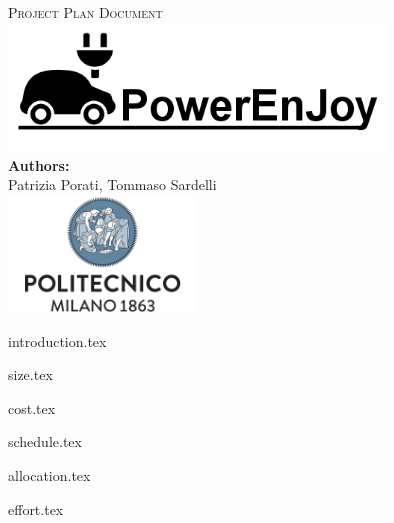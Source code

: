 \documentclass[a4paper,11pt]{article}
\begin{document}
\begin{titlepage}
\begin{center}
\textsc{\LARGE Project Plan Document}\\[1.5cm] %

\includegraphics[width=10cm]{PowerEnJoy.png}\\
\vfill
\vfill
\textbf{Authors:}\\
Patrizia Porati, Tommaso Sardelli\\[2.0cm] 


\vfill
\vfill
\includegraphics[width=50mm]{polimi.png}\\
\end{center}
\end{titlepage}

\tableofcontents
\pagebreak

{introduction.tex}


{size.tex}


{cost.tex}


{schedule.tex}

{allocation.tex}


{effort.tex}
\end{document}
